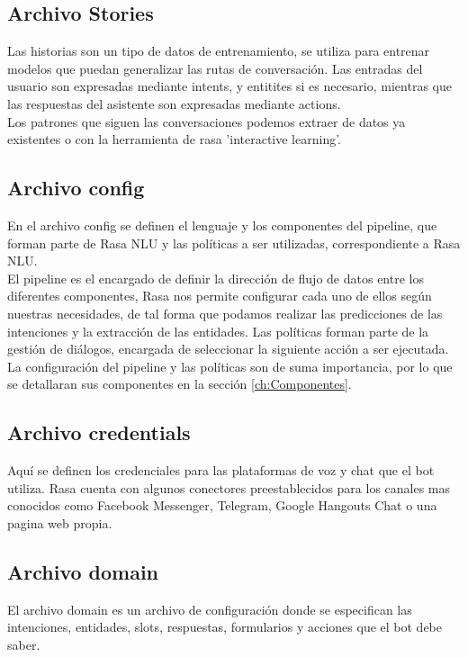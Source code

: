 \subsection{Archivo Stories}
Las historias son un tipo de datos de entrenamiento, se utiliza para entrenar modelos que puedan
generalizar las rutas de conversación. Las entradas del usuario son expresadas mediante intents, y
entitites si es necesario,  mientras que las respuestas del asistente son expresadas mediante
actions.\\
Los patrones que siguen las conversaciones podemos extraer de datos ya existentes o con la
herramienta de rasa 'interactive learning'.\cite{Stories_Documentation}

\subsection{Archivo config}
En el archivo config se definen el lenguaje y los componentes del pipeline, que forman parte de
Rasa NLU y las políticas a ser utilizadas, correspondiente a Rasa NLU.\\
El pipeline es el encargado de definir la dirección de flujo de datos entre los diferentes
componentes, Rasa nos permite configurar cada uno de ellos según nuestras necesidades, de tal forma
que podamos realizar las predicciones de las intenciones y la extracción de las entidades. Las
políticas forman parte de la gestión de diálogos, encargada de seleccionar la siguiente acción a
ser ejecutada.\cite{Configuration_Documentation}\\
La configuración del pipeline y las políticas son de suma importancia, por lo que se detallaran sus
componentes en la sección \ref{ch:Componentes}.

\subsection{Archivo credentials}
Aquí se definen los credenciales para las plataformas de voz y chat que el bot utiliza. Rasa cuenta
con algunos conectores preestablecidos para los canales mas conocidos como Facebook Messenger,
Telegram, Google Hangouts Chat o una pagina web propia.\cite{Credentials_Documentation}

\subsection{Archivo domain}
El archivo domain es un archivo de configuración donde se especifican las intenciones, entidades,
slots, respuestas, formularios y acciones que el bot debe saber.\cite{Domain_Documentation}

